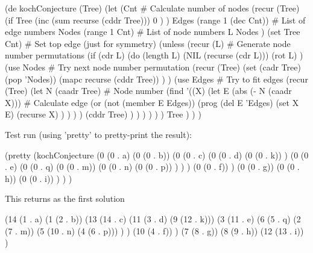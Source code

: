 \begin{wideverbatim}


(de kochConjecture (Tree)
   (let
      (Cnt                             # Calculate number of nodes
         (recur (Tree)
            (if Tree
               (inc (sum recurse (cddr Tree)))
               0 ) )
         Edges (range 1 (dec Cnt))     # List of edge numbers
         Nodes (range 1 Cnt)           # List of node numbers
         L Nodes )
      (set Tree Cnt)                   # Set top edge (just for symmetry)
      (unless
         (recur (L)                    # Generate node number permutations
            (if (cdr L)
               (do (length L)
                  (NIL (recurse (cdr L)))
                  (rot L) )
               (use Nodes                 # Try next node number permutation
                  (recur (Tree)
                     (set (cadr Tree) (pop 'Nodes))
                     (mapc recurse (cddr Tree)) ) )
               (use Edges                 # Try to fit edges
                  (recur (Tree)
                     (let N (caadr Tree)  # Node number
                        (find
                           '((X)
                              (let E (abs (- N (caadr X)))  # Calculate edge
                                 (or
                                    (not (member E Edges))
                                    (prog
                                       (del E 'Edges)
                                       (set X E)
                                       (recurse X) ) ) ) )
                           (cddr Tree) ) ) ) ) ) )
         Tree ) ) )

\end{wideverbatim}

\begin{wideverbatim}


Test run (using 'pretty' to pretty-print the result):

(pretty
   (kochConjecture
      (0 (0 . a)
         (0 (0 . b))
         (0 (0 . c)
            (0 (0 . d)
               (0 (0 . k)) )
            (0 (0 . e)
               (0 (0 . q)
                  (0 (0 . m))
                  (0 (0 . n)
                     (0 (0 . p)) ) ) )
            (0 (0 . f)) )
         (0 (0 . g))
         (0 (0 . h))
         (0 (0 . i)) ) ) )

This returns as the first solution

(14
   (1 . a)
   (1 (2 . b))
   (13
      (14 . c)
      (11 (3 . d) (9 (12 . k)))
      (3
         (11 . e)
         (6
            (5 . q)
            (2 (7 . m))
            (5 (10 . n) (4 (6 . p))) ) )
      (10 (4 . f)) )
   (7 (8 . g))
   (8 (9 . h))
   (12 (13 . i)) )

\end{wideverbatim}

